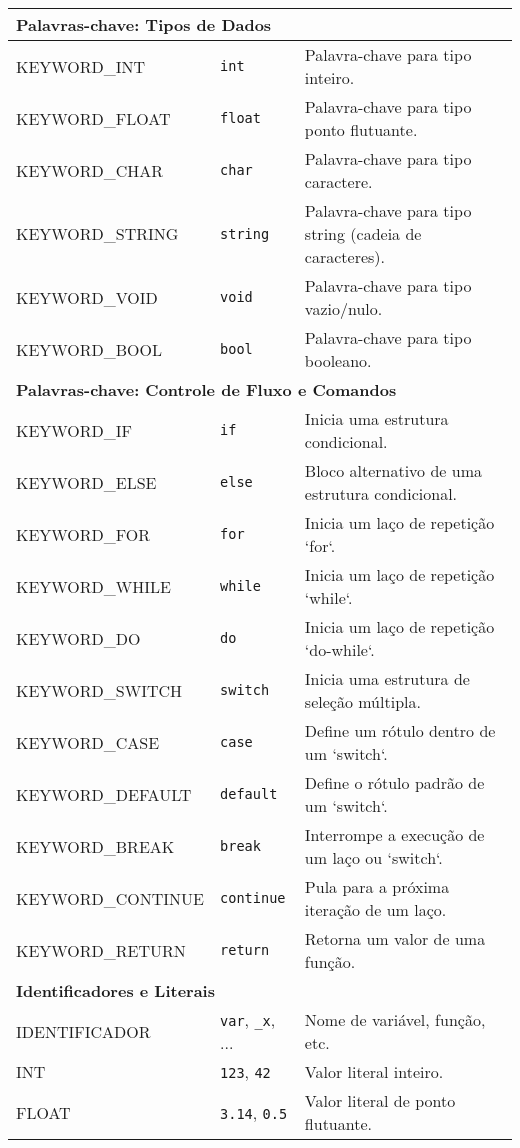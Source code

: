 \documentclass[12pt,a4paper]{article}
\begin{document}
\begin{longtable}{lll}
\multicolumn{3}{l}{\textbf{Palavras-chave: Tipos de Dados}} \\
\midrule
KEYWORD\_INT & \texttt{int} & Palavra-chave para tipo inteiro. \\
KEYWORD\_FLOAT & \texttt{float} & Palavra-chave para tipo ponto flutuante. \\
KEYWORD\_CHAR & \texttt{char} & Palavra-chave para tipo caractere. \\
KEYWORD\_STRING & \texttt{string} & Palavra-chave para tipo string (cadeia de caracteres). \\
KEYWORD\_VOID & \texttt{void} & Palavra-chave para tipo vazio/nulo. \\
KEYWORD\_BOOL & \texttt{bool} & Palavra-chave para tipo booleano. \\
\midrule
\multicolumn{3}{l}{\textbf{Palavras-chave: Controle de Fluxo e Comandos}} \\
\midrule
KEYWORD\_IF & \texttt{if} & Inicia uma estrutura condicional. \\
KEYWORD\_ELSE & \texttt{else} & Bloco alternativo de uma estrutura condicional. \\
KEYWORD\_FOR & \texttt{for} & Inicia um laço de repetição `for`. \\
KEYWORD\_WHILE & \texttt{while} & Inicia um laço de repetição `while`. \\
KEYWORD\_DO & \texttt{do} & Inicia um laço de repetição `do-while`. \\
KEYWORD\_SWITCH & \texttt{switch} & Inicia uma estrutura de seleção múltipla. \\
KEYWORD\_CASE & \texttt{case} & Define um rótulo dentro de um `switch`. \\
KEYWORD\_DEFAULT & \texttt{default} & Define o rótulo padrão de um `switch`. \\
KEYWORD\_BREAK & \texttt{break} & Interrompe a execução de um laço ou `switch`. \\
KEYWORD\_CONTINUE & \texttt{continue} & Pula para a próxima iteração de um laço. \\
KEYWORD\_RETURN & \texttt{return} & Retorna um valor de uma função. \\
\midrule
\multicolumn{3}{l}{\textbf{Identificadores e Literais}} \\
\midrule
IDENTIFICADOR & \texttt{var}, \texttt{\_x}, ... & Nome de variável, função, etc. \\
INT & \texttt{123}, \texttt{42} & Valor literal inteiro. \\
FLOAT & \texttt{3.14}, \texttt{0.5} & Valor literal de ponto flutuante. \\

\end{longtable}
\end{document}

